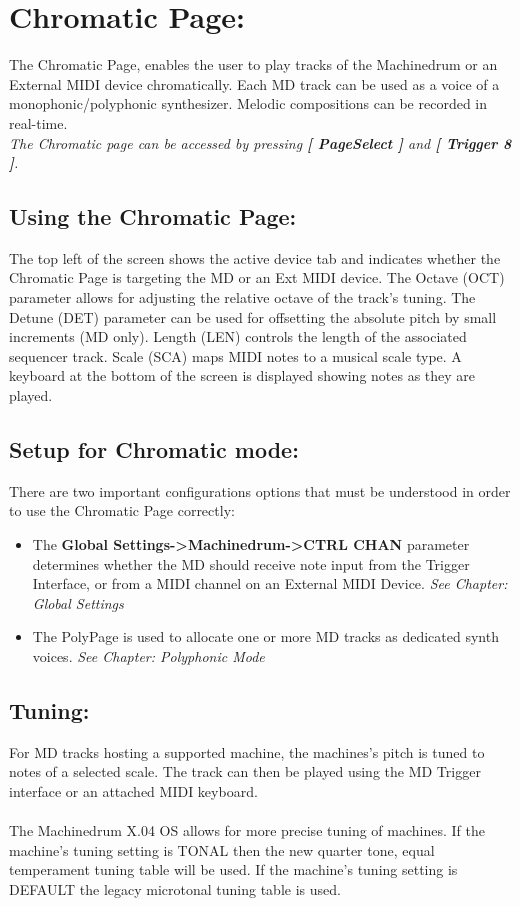 \chapter{Chromatic Page:}
The Chromatic Page, enables the user to play tracks of the Machinedrum or an External MIDI device chromatically. Each MD track can be used as a voice of a monophonic/polyphonic synthesizer. Melodic compositions can be recorded in real-time.
\\
\textit{The Chromatic page can be accessed by pressing \textbf{[ PageSelect ]} and \textbf{[ Trigger 8 ]}.}
\\
\section{Using the Chromatic Page:}
The top left of the screen shows the active device tab and indicates whether the Chromatic Page is targeting the MD or an Ext MIDI device.
The Octave (OCT) parameter allows for adjusting the relative octave of the track's tuning. The Detune (DET) parameter can be used for offsetting the absolute pitch by small increments (MD only). Length (LEN) controls the length of the associated sequencer track. Scale (SCA) maps MIDI notes to a musical scale type.
A keyboard at the bottom of the screen is displayed showing notes as they are played.
\newpage
\section{Setup for Chromatic mode:}
There are two important configurations options that must be understood in order to use the Chromatic Page correctly:
\begin{itemize}
    \item The \textbf{Global Settings->Machinedrum->CTRL CHAN} parameter determines whether the MD should receive note input from the Trigger Interface, or from a MIDI channel on an External MIDI Device. \textit{See Chapter: Global Settings}
    \item The PolyPage is used to allocate one or more MD tracks as dedicated synth voices. \textit{See Chapter: Polyphonic Mode} 
\end{itemize}

\section{Tuning:}
For MD tracks hosting a supported machine, the machines’s pitch is tuned to notes of a selected scale. The track can then be played using the MD Trigger interface or an attached MIDI keyboard.\\\\
The Machinedrum X.04 OS allows for more precise tuning of machines. If the machine's tuning setting is TONAL then the new quarter tone, equal temperament tuning table will be used. If the machine's tuning setting is DEFAULT the legacy microtonal tuning table is used.
\\
